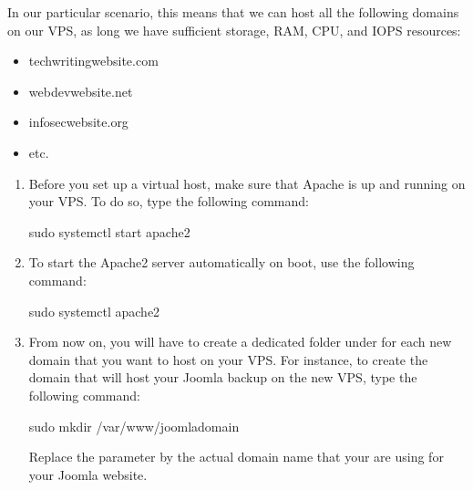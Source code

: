 \documentclass[a4paper,10pt,english,openany,oneside]{sphinxmanual}
\begin{document}
\sphinxAtStartPar
In our particular scenario, this means that we can host all the following domains on our VPS, as long we have sufficient storage, RAM, CPU, and IOPS resources:
\begin{itemize}
\item {} 
\sphinxAtStartPar
techwriting\sphinxhyphen{}website.com

\item {} 
\sphinxAtStartPar
webdev\sphinxhyphen{}website.net

\item {} 
\sphinxAtStartPar
infosec\sphinxhyphen{}website.org

\item {} 
\sphinxAtStartPar
etc.

\end{itemize}
\begin{enumerate}
%
\item {} 
\sphinxAtStartPar
Before you set up a virtual host, make sure that Apache is up and running on your VPS. To do so, type the following command:

\begin{sphinxVerbatim}[commandchars=\\\{\}]
\PYGZdl{} sudo systemctl start apache2
\end{sphinxVerbatim}

\item {} 
\sphinxAtStartPar
To start the Apache2 server automatically on boot, use the following command:

\begin{sphinxVerbatim}[commandchars=\\\{\}]
\PYGZdl{} sudo systemctl  apache2
\end{sphinxVerbatim}

\item {} 
\sphinxAtStartPar
From now on, you will have to create a dedicated folder under  for each new domain that you want to host on your VPS. For instance, to create the domain that will host your Joomla backup on the new VPS, type the following command:

\begin{sphinxVerbatim}[commandchars=\\\{\}]
\PYGZdl{} sudo mkdir /var/www/joomla\PYGZhy{}domain
\end{sphinxVerbatim}

\sphinxAtStartPar
Replace the parameter  by the actual domain name that your are using for your Joomla website.


\end{enumerate}
\end{document}
